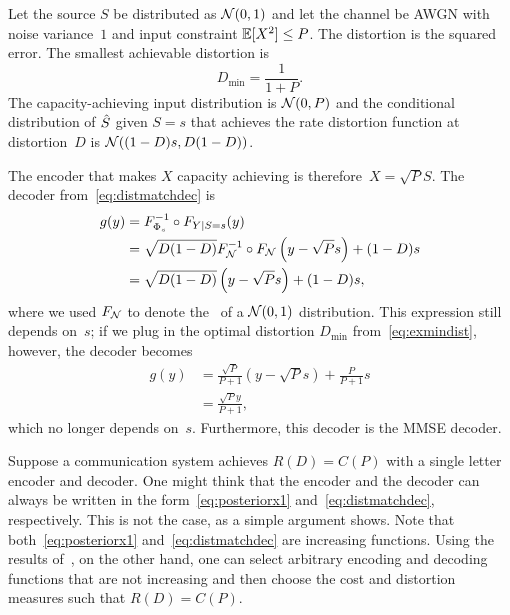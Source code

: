\begin{example}
  Let the source $S$ be distributed as ${\mathcal{N}}(0,1)$ and let the channel be AWGN
  with noise variance~$1$ and input constraint $\mathbb{E}[X^2] \le P$.
  The distortion is the squared error. The smallest achievable distortion is
  \begin{equation}
    \label{eq:exmindist}
    D_{\min} = \frac{1}{1 + P}.
  \end{equation}
  The capacity-achieving input distribution is ${\mathcal{N}}(0,P)$ and the conditional
  distribution of ${\hat{S}}$ given $S=s$ that achieves the rate distortion function
  at distortion~$D$ is ${\mathcal{N}}((1-D)s, D(1-D))$.
  
  The encoder that makes $X$ capacity achieving is therefore~$X = \sqrt{P}S$.
  The decoder from~\eqref{eq:distmatchdec} is
  \begin{align*}
    g(y) &= F_{\Phi_s}^{-1} \circ F_{Y|S=s}(y) \\
    &= \sqrt{D(1-D)} F_{{\mathcal{N}}}^{-1} \circ F_{{\mathcal{N}}}\left( y-\sqrt{P}s
    \right) + (1-D)s \\
    &= \sqrt{D(1-D)} \left( y-\sqrt{P}s \right) + (1-D)s,
  \end{align*}
  where we used $F_{{\mathcal{N}}}$ to denote the \cdf\ of a ${\mathcal{N}}(0,1)$ distribution.
  This expression still depends on~$s$; if we plug in the optimal distortion
  $D_{\min}$ from~\eqref{eq:exmindist}, however, the decoder becomes
  \begin{align*}
    g(y) &= \frac{\sqrt{P}}{P+1} (y - \sqrt{P}s) + \frac{P}{P +
    1}s \\ 
    &= \frac{\sqrt{P}y}{P + 1},
  \end{align*}
  which no longer depends on~$s$. Furthermore, this decoder is the MMSE decoder.
\end{example}


\begin{remark}
  \label{rem:increasingdec}
  Suppose a communication system achieves $R(D) = C(P)$ with a single letter
  encoder and decoder. One might think that the encoder and the decoder can
  always be written in the form~\eqref{eq:posteriorx1}
  and~\eqref{eq:distmatchdec}, respectively. This is not the case, as a simple
  argument shows. Note that both~\eqref{eq:posteriorx1}
  and~\eqref{eq:distmatchdec} are increasing functions. Using the results
  of~\cite{GastparThesis}, on the other hand, one can select arbitrary encoding
  and decoding functions that are not increasing and then choose the cost and
  distortion measures such that $R(D) = C(P)$.
\end{remark}


